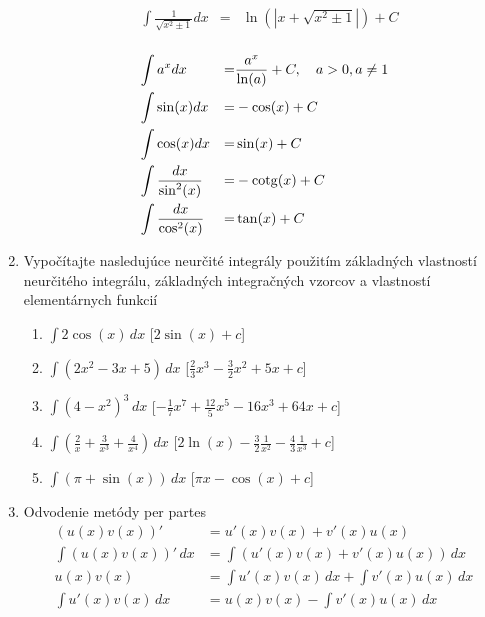 \begin{enumerate}
\begin{minipage}[t]{0.40\linewidth}
\begin{align*}
&\int \frac{1}{\sqrt{x^2\pm1}} dx &=&\ln(|x+\sqrt{x^2 \pm 1}|) +C \\
\end{align*}
\end{minipage}
\begin{minipage}[t]{0.52\linewidth}
\begin{align*}
&\int a^x dx &=& \frac{a^x}{\ln(a)}+C, \quad a>0, a \neq 1 \\
&\int \sin(x) dx &=& -\cos(x)+C \\
&\int \cos(x) dx &=& \sin(x)+C \\
&\int \frac{dx}{\sin^2(x)} &=& -\operatorname{cotg}(x)+C \\
&\int \frac{dx}{\cos^2(x)} &=& \tan(x)+C 
\end{align*}
\end{minipage}

\item Vypočítajte nasledujúce neurčité integrály použitím základných vlastností neurčitého integrálu, základných integračných vzorcov a vlastností elementárnych funkcií
\begin{enumerate}
\item{$ \int 2 \cos (x) \,dx$} \hspace{\fill} [$2 \sin (x) +c$]
\item{$ \int (2x^2-3x+5)\,dx$} \hspace{\fill} [$ \frac{2}{3}x^3 -  \frac{3}{2}x^2 +5x +c$]
\item{$ \int (4-x^2)^3\,dx$} \hspace{\fill} [$-\frac{1}{7}x^7+\frac{12}{5}  x^5- 16x^3  +64x+c$]
\item{$ \int (\frac{2}{x}+\frac{3}{x^3}+\frac{4}{x^4})\,dx$} \hspace{\fill} [$2 \ln(x) - \frac{3}{2} \frac{1}{x^2} -\frac{4}{3} \frac{1}{x^3} +c$]
\item{$ \int (\pi+\sin(x))\,dx$} \hspace{\fill} [$ \pi x - \cos(x) +c$]
\end{enumerate}

\item Odvodenie metódy per partes
\begin{align*}
(u(x)v(x))'&=u'(x)v(x)+v'(x)u(x) \\
\int (u(x)v(x))'\, dx &= \int (u'(x)v(x)+v'(x)u(x)) \,dx\\
u(x)v(x)&= \int u'(x)v(x) \,dx + \int v'(x)u(x) \,dx \\
\int u'(x)v(x) \,dx&=u(x)v(x)- \int v'(x)u(x) \,dx 
\end{align*}


\end{enumerate}
